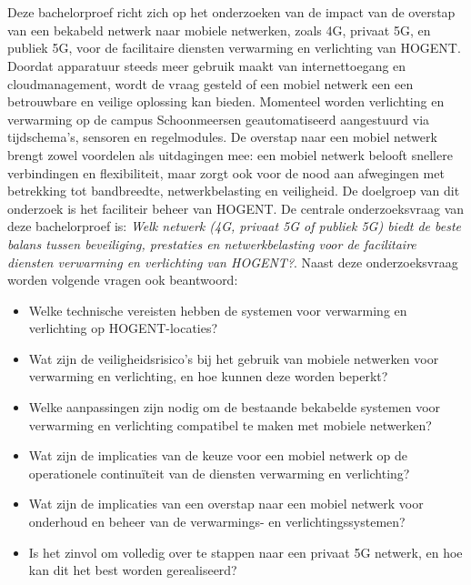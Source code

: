 
\chapter{}%
\label{ch:inleiding}

Deze bachelorproef richt zich op het onderzoeken van de impact van de overstap van een bekabeld netwerk naar mobiele netwerken, zoals 4G, privaat 5G, en publiek 5G, voor de facilitaire diensten verwarming en verlichting van HOGENT. Doordat apparatuur steeds meer gebruik maakt van internettoegang en cloudmanagement, wordt de vraag gesteld of een mobiel netwerk een een betrouwbare en veilige oplossing kan bieden. Momenteel worden verlichting en verwarming op de campus Schoonmeersen geautomatiseerd aangestuurd via tijdschema's, sensoren en regelmodules. De overstap naar een mobiel netwerk brengt zowel voordelen als uitdagingen mee: een mobiel netwerk belooft snellere verbindingen en flexibiliteit, maar zorgt ook voor de nood aan afwegingen met betrekking tot bandbreedte, netwerkbelasting en veiligheid. De doelgroep van dit onderzoek is het faciliteir beheer van HOGENT. De centrale onderzoeksvraag van deze bachelorproef is: \textit{Welk netwerk (4G, privaat 5G of publiek 5G) biedt de beste balans tussen beveiliging, prestaties en netwerkbelasting voor de facilitaire diensten verwarming en verlichting van HOGENT?}. Naast deze onderzoeksvraag worden volgende vragen ook beantwoord: 
\begin{itemize}
    \item Welke technische vereisten hebben de systemen voor verwarming en verlichting op HOGENT-locaties?
    \item Wat zijn de veiligheidsrisico’s bij het gebruik van mobiele netwerken voor verwarming en verlichting, en hoe kunnen deze worden beperkt?
    \item Welke aanpassingen zijn nodig om de bestaande bekabelde systemen voor verwarming en verlichting compatibel te maken met mobiele netwerken?
    \item Wat zijn de implicaties van de keuze voor een mobiel netwerk op de operationele continuïteit van de diensten verwarming en verlichting?
    \item Wat zijn de implicaties van een overstap naar een mobiel netwerk voor onderhoud en beheer van de verwarmings- en verlichtingssystemen?
    \item Is het zinvol om volledig over te stappen naar een privaat 5G netwerk, en hoe kan dit het best worden gerealiseerd?
\end{itemize}
